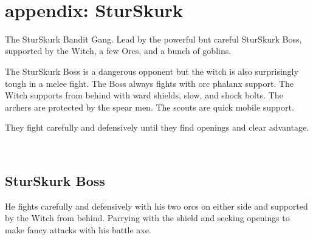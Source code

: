 \































\clearpage
\raggedbottom
\section*{appendix: SturSkurk}
\label{appendixsturskurk}

The SturSkurk Bandit Gang. Lead by the powerful but careful SturSkurk Boss, supported by the Witch, a few Orcs, and a bunch of goblins.

The SturSkurk Boss is a dangerous opponent but the witch is also surprisingly tough in a melee fight. The Boss always fights with orc phalanx support. The Witch supports from behind with ward shields, slow, and shock bolts. The archers are protected by the spear men. The scouts are quick mobile support.

They fight carefully and defensively until they find openings and clear advantage.

\


\subsection*{SturSkurk Boss}
\label{sturskurkboss}

He fights carefully and defensively with his two orcs on either side and supported by the Witch from behind. Parrying with the shield and seeking openings to make fancy attacks with his battle axe.

\

